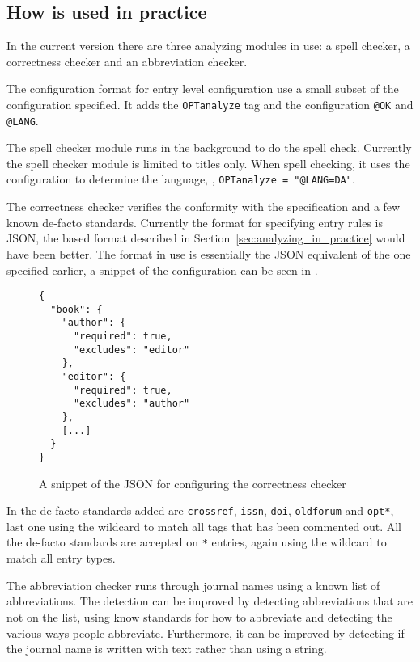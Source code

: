 \subsection{How {\orangutan} is used in practice}

In the current version there are three analyzing modules in use: a
spell checker, a correctness checker and an abbreviation checker.

The configuration format for entry level configuration use a small
subset of the configuration specified.  It adds the
\texttt{OPTanalyze} tag and the configuration \texttt{@OK} and
\texttt{@LANG}.

The spell checker module runs  in the background to do
the spell check.  Currently the spell checker module is limited to
titles only.  When spell checking, it uses the configuration to
determine the language, \eg, \texttt{OPTanalyze = "@LANG=DA"}.

The correctness checker verifies the conformity with the {\bibtex}
specification and a few known de-facto standards.  Currently the
format for specifying entry rules is JSON, the {\bibtex} based format
described in Section~\ref{sec:analyzing_in_practice} would have been
better.  The format in use is essentially the JSON equivalent of the
one specified earlier, a snippet of the configuration can be seen in
.

\begin{figure}
  \centering
\begin{verbatim}
{
  "book": {
    "author": {
      "required": true,
      "excludes": "editor"
    },
    "editor": {
      "required": true,
      "excludes": "author"
    },
    [...]
  }
}
\end{verbatim}
\caption{A snippet of the JSON for configuring the correctness checker}
\label{fig:correctness_checker_json}
\end{figure}

In {\orangutan} the de-facto standards added are \texttt{crossref},
\texttt{issn}, \texttt{doi}, \texttt{oldforum} and \texttt{opt*}, last
one using the wildcard to match all tags that has been commented out.
All the de-facto standards are accepted on \texttt{*} entries, again
using the wildcard to match all entry types.

The abbreviation checker runs through journal names using a known list
of abbreviations.  The detection can be improved by detecting
abbreviations that are not on the list, using know standards for how
to abbreviate and detecting the various ways people abbreviate.
Furthermore, it can be improved by detecting if the journal name is
written with text rather than using a {\bibtex} string.


